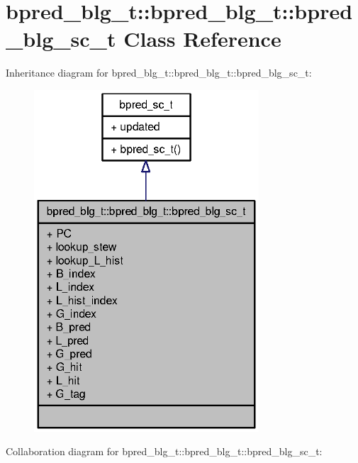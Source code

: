 \section{bpred\_\-blg\_\-t::bpred\_\-blg\_\-t::bpred\_\-blg\_\-sc\_\-t Class Reference}
\label{classbpred__blg__t_1_1bpred__blg__sc__t}
Inheritance diagram for bpred\_\-blg\_\-t::bpred\_\-blg\_\-t::bpred\_\-blg\_\-sc\_\-t:\nopagebreak
\begin{figure}[H]
\begin{center}
\leavevmode
\includegraphics[width=238pt]{classbpred__blg__t_1_1bpred__blg__sc__t__inherit__graph}
\end{center}
\end{figure}
Collaboration diagram for bpred\_\-blg\_\-t::bpred\_\-blg\_\-t::bpred\_\-blg\_\-sc\_\-t:\nopagebreak
